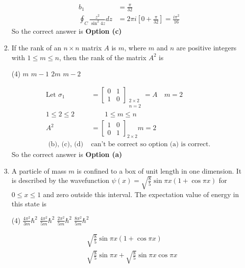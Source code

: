 \begin{enumerate}
\begin{answer}
\begin{align*}
b_{1}&=\frac{\pi}{32}\\
\oint_{C} \frac{z^{2}}{\sin ^{2} 4 z} d z&=2 \pi i\left[0+\frac{\pi}{32}\right]=\frac{i \pi^{2}}{16}
	\end{align*}
	So the correct answer is \textbf{Option (c)}
\end{answer}
\item If the rank of an $n \times n$ matrix $A$ is $m$, where $m$ and $n$ are positive integers with $1 \leq m \leq n$, then the rank of the matrix $A^{2}$ is
 \begin{tasks}(4)
	\task[\textbf{a.}]$m$
	\task[\textbf{b.}]$m-1$
	\task[\textbf{c.}]$2 m$
	\task[\textbf{d.}]$m-2$ 
\end{tasks}
\begin{answer}
	\begin{align*}
	\text{Let }\sigma_{1}&=\left[\begin{array}{ll}0 & 1 \\ 1 & 0\end{array}\right]_{\substack{2 \times 2 \\ n=2}}=A \quad m=2\\
	1 \leq 2 \leq 2 &\qquad 1 \leq m \leq n\\
	A^{2}&=\left[\begin{array}{ll}
	1 & 0 \\
	0 & 1
	\end{array}\right]_{2 \times 2} m=2\\
	\text { (b), (c), (d) }&\text{can't be correct so option (a) is correct. }
	\end{align*}
		So the correct answer is \textbf{Option (a)}
\end{answer}
\item A particle of mass $m$ is confined to a box of unit length in one dimension. It is described by the wavefunction $\psi(x)=\sqrt{\frac{8}{5}} \sin \pi x(1+\cos \pi x)$ for $0 \leq x \leq 1$ and zero outside this interval. The expectation value of energy in this state is
 \begin{tasks}(4)
	\task[\textbf{a.}] $\frac{4 \pi^{2}}{3 m} \hbar^{2}$
	\task[\textbf{b.}]$\frac{4 \pi^{2}}{5 m} \hbar^{2}$
	\task[\textbf{c.}]$\frac{2 \pi^{2}}{5 m} \hbar^{2}$
	\task[\textbf{d.}]  $\frac{8 \pi^{2}}{5 m} \hbar^{2}$
\end{tasks}
\begin{answer}
	\begin{align*}
	&\sqrt{\frac{8}{5}} \sin \pi x(1+\cos \pi x)\\
	&\sqrt{\frac{8}{5}} \sin \pi x+\sqrt{\frac{8}{5}} \sin \pi x \cos \pi x \\

\end{align*}
\end{answer}
\end{enumerate}
